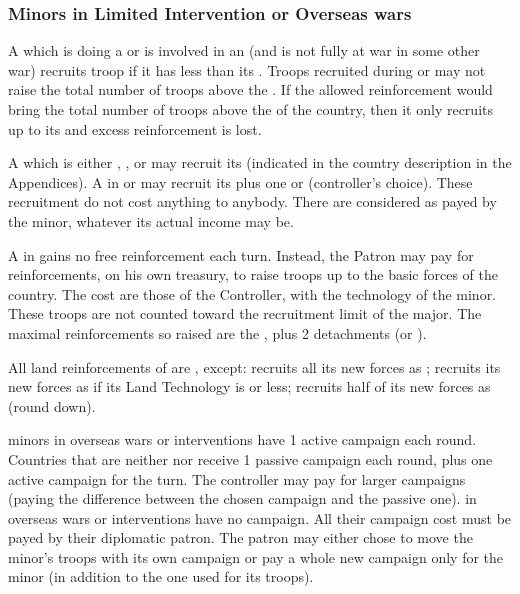 \subsubsection{Minors in Limited Intervention or Overseas wars}
\bparag A \MIN which is doing a  or is involved in
an  (and is not fully at war in some other war) recruits
troop if it has less than its .
\bparag Troops recruited during  or
 may not raise the total number of troops above the
.
\bparag If the allowed reinforcement would bring the total number of troops
above the  of the country, then it only recruits up to its
 and excess reinforcement is lost.

\bparag A \MIN which is either \Neutral, \RM, \SUB or \MA may recruit its
 (indicated in the country description in the
Appendices).
\bparag A \MIN in \CE or \EW may recruit its  plus
one \LD or \ND (controller's choice).
\bparag These recruitment do not cost anything to anybody. There are
considered as payed by the minor, whatever its actual income may be.

\bparag A \MIN in \VASSAL gains no free reinforcement each turn.
\bparag Instead, the Patron may pay for reinforcements, on his own treasury,
to raise troops up to the basic forces of the country.
\bparag The cost are those of the Controller, with the technology of the
minor.
\bparag These troops are not counted toward the recruitment limit of the
major.
\bparag The maximal reinforcements so raised are the , plus 2 detachments (\LD or \ND).

\aparag[Moral]
\bparag All land reinforcements of \MIN are , except:
\bparag \paysSuede recruits all its new forces as ;
\bparag \paysSuisse recruits its new forces as  if its Land
Technology is \TMUS or less;
\bparag \paysPerse recruits half of its new forces as  (round
down).

\aparag[Campaigns]
\bparag \Neutral minors in overseas wars or interventions have 1 active campaign
each round.
\bparag Countries that are neither \Neutral nor \VASSAL receive 1 passive
campaign each round, plus one active campaign for the turn. The controller may
pay for larger campaigns (paying the difference between the chosen campaign
and the passive one).
\bparag \VASSAL in overseas wars or interventions have no campaign. All their
campaign cost must be payed by their diplomatic patron. The patron may either
chose to move the minor's troops with its own campaign or pay a whole new
campaign only for the minor (in addition to the one used for its troops).

